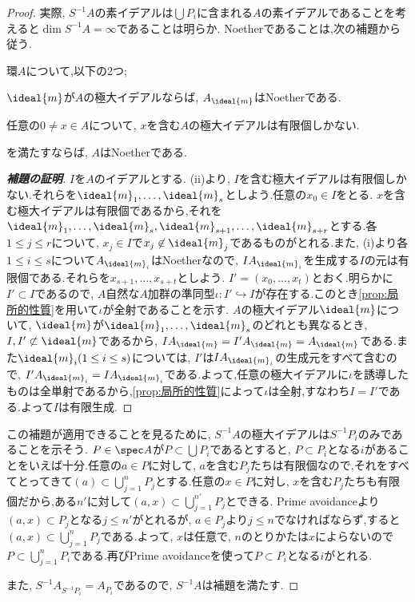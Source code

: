 \begin{proof}
実際, $S^{-1}A$の素イデアルは$\bigcup P_i$に含まれる$A$の素イデアルであることを考えると$\dim S^{-1}A=\infty$であることは明らか. Noetherであることは,次の補題から従う.
		
\begin{lem}
	環$A$について,以下の2つ;
	\begin{sakura}
		\item $\ideal{m}$が$A$の極大イデアルならば, $A_{\ideal{m}}$はNoetherである.
		\item 任意の$0\neq x\in A$について, $x$を含む$A$の極大イデアルは有限個しかない.
	\end{sakura}
		を満たすならば, $A$はNoetherである.
\end{lem}
		
\begin{proof}[\textbf{補題の証明}]
	$I$を$A$のイデアルとする. (ii)より, $I$を含む極大イデアルは有限個しかない.それらを$\ideal{m}_1,\dots,\ideal{m}_s$としよう.任意の$x_0\in I$をとる. $x$を含む極大イデアルは有限個であるから,それを$\ideal{m}_1,\dots,\ideal{m}_s,\ideal{m}_{s+1},\dots,\ideal{m}_{s+r}$とする.各$1\leq j\leq r$について, $x_j\in I$で$x_j\not\in\ideal{m}_j$であるものがとれる.また, (i)より各$1\leq i\leq s$について$A_{\ideal{m}_i}$はNoetherなので, $IA_{\ideal{m}_i}$を生成する$I$の元は有限個である.それらを$x_{s+1},\dots,x_{s+t}$としよう. $I'=(x_0,\dots,x_t)$とおく.明らかに$I'\subset I$であるので, $A$自然な$A$加群の準同型$\iota:I'\hookrightarrow I$が存在する.このとき\ref{prop:局所的性質}を用いて$\iota$が全射であることを示す. $A$の極大イデアル$\ideal{m}$について, $\ideal{m}$が$\ideal{m}_1,\dots,\ideal{m}_s$のどれとも異なるとき, $I,I'\not\subset\ideal{m}$であるから, $IA_{\ideal{m}}=I'A_{\ideal{m}}=A_{\ideal{m}}$である.また$\ideal{m}_i (1\leq i\leq s)$については, $I'$は$IA_{\ideal{m}_i}$の生成元をすべて含むので, $I'A_{\ideal{m}_i}=IA_{\ideal{m}_i}$である.よって,任意の極大イデアルに$\iota$を誘導したものは全単射であるから,\ref{prop:局所的性質}によって$\iota$は全射,すなわち$I=I'$である.よって$I$は有限生成.
\end{proof}
		
この補題が適用できることを見るために, $S^{-1}A$の極大イデアルは$S^{-1}P_i$のみであることを示そう. $P\in\spec A$が$P\subset\bigcup P_i$であるとすると, $P\subset P_i$となる$i$があることをいえば十分.任意の$a\in P$に対して, $a$を含む$P_j$たちは有限個なので,それをすべてとってきて$(a)\subset\bigcup_{j=1}^n P_j$とする.任意の$x\in P$に対し, $x$を含む$P_j$たちも有限個だから,ある$n'$に対して$(a,x)\subset\bigcup_{j=1}^{n'}P_j$とできる. Prime avoidanceより$(a,x)\subset P_{j}$となる$j\leq n'$がとれるが, $a\in P_j$より$j\leq n$でなければならず,すると$(a,x)\subset\bigcup_{j=1}^n P_j$である.よって, $x$は任意で, $n$のとりかたは$x$によらないので$P\subset\bigcup_{j=1}^n P_i$である.再びPrime avoidanceを使って$P\subset P_i$となる$i$がとれる.

また, ${S^{-1}A}_{S^{-1}P_i}=A_{P_i}$であるので, $S^{-1}A$は補題を満たす.

\end{proof}
